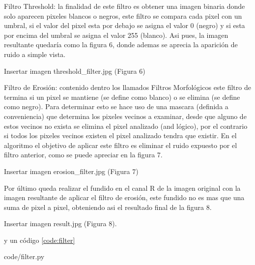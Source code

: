 \documentclass[twoside]{article}
\begin{document}
Filtro Threshold: la finalidad de este filtro es obtener una imagen binaria donde solo aparecen pixeles blancos o negros, este filtro se compara cada pixel con un umbral, si el valor del pixel esta por debajo se asigna el valor 0 (negro) y si esta por encima del umbral se asigna el valor 255 (blanco). Asi pues, la imagen resultante quedaría como la figura 6, donde ademas se aprecia la aparición de ruido a simple vista.

Insertar imagen threshold_filter.jpg (Figura 6)

Filtro de Erosión: contenido dentro los llamados Filtros Morfológicos este filtro de termina si un pixel se mantiene (se define como blanco) o se elimina (se define como negro). Para determinar esto se hace uso de una mascara (definida a conveniencia) que determina los pixeles vecinos a examinar, desde que alguno de estos vecinos no exista se elimina el pixel analizado (and lógico), por el contrario si todos los pixeles vecinos existen el pixel analizado tendra que existir. En el algoritmo el objetivo de aplicar este filtro es eliminar el ruido expuesto por el filtro anterior, como se puede apreciar en la figura  7.

Insertar imagen erosion_filter.jpg (Figura 7)

Por último  queda realizar el fundido en el canal R de la imagen original con la imagen resultante de aplicar el filtro de erosión, este fundido no es mas que una suma de pixel a pixel, obteniendo asi el resultado final de la figura 8.

Insertar imagen result.jpg (Figura 8).

y un código \ref{code:filter}

%
   {code/filter.py}



\end{document}
